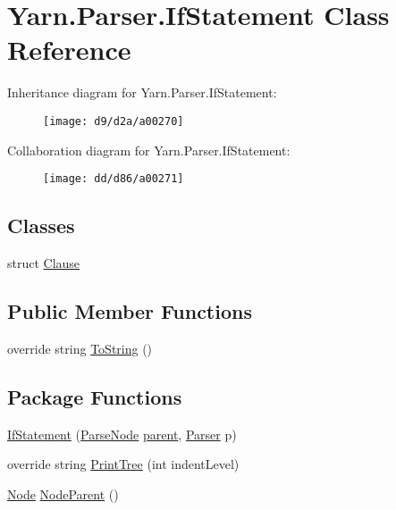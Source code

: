 \hypertarget{a00043}{\section{Yarn.\-Parser.\-If\-Statement Class Reference}
\label{a00043}
}


Inheritance diagram for Yarn.\-Parser.\-If\-Statement\-:
\nopagebreak
\begin{figure}[H]
\begin{center}
\leavevmode
\texttt{[image: d9/d2a/a00270]}
\end{center}
\end{figure}


Collaboration diagram for Yarn.\-Parser.\-If\-Statement\-:
\nopagebreak
\begin{figure}[H]
\begin{center}
\leavevmode
\texttt{[image: dd/d86/a00271]}
\end{center}
\end{figure}
\subsection*{Classes}
\begin{DoxyCompactItemize}
\item 
struct \hyperlink{a00025}{Clause}
\end{DoxyCompactItemize}
\subsection*{Public Member Functions}
\begin{DoxyCompactItemize}
\item 
override string \hyperlink{a00063_a18c67cb16090d0889bb9d6c8c6c565f8}{To\-String} ()
\end{DoxyCompactItemize}
\subsection*{Package Functions}
\begin{DoxyCompactItemize}
\item 
\hyperlink{a00043_ae534078389e8663edf7660403acf3cbc}{If\-Statement} (\hyperlink{a00063}{Parse\-Node} \hyperlink{a00063_af313a82103fcc2ff5a177dbb06b92f7b}{parent}, \hyperlink{a00064}{Parser} p)
\item 
override string \hyperlink{a00043_a5494c1daef8e0f3ac3ab68f91db4f332}{Print\-Tree} (int indent\-Level)
\item 
\hyperlink{a00054}{Node} \hyperlink{a00063_a580e520a29444fc23ac3660cbe514a09}{Node\-Parent} ()
\end{DoxyCompactItemize}

